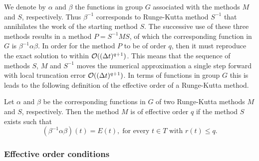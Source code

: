 We denote by $\alpha$ and $\beta$ the functions in group $G$ associated with the methods $M$ and $S$, respectively.  Thus $\beta^{-1}$ corresponds to Runge-Kutta method $S^{-1}$ that annihilates the work of the starting method $S$. The successive use of these three methods results in a method $P = S^{-1}MS$, of which the corresponding function in $G$ is $\beta^{-1}\alpha\beta$. In order for the method $P$ to be of order $q$, then it must reproduce the exact solution to within $\mathcal{O}((\Delta t)^{q+1})$. This means that the sequence of methods \( S \), \( M \) and \( S^{-1} \) moves the numerical approximation a single step forward with local truncation error \( \mathcal{O}((\Delta t)^{q+1}) \). In terms of functions in group $G$ this is leads to the following definition of the effective order of a Runge-Kutta method.
\begin{definition}\cite{Butcher1987_book}\label{def:Effective_order}
	Let $\alpha$ and $\beta$ be the corresponding functions in $G$ of two Runge-Kutta methods $M$ and $S$, respectively. Then the method $M$ is of effective order $q$ if the method $S$ exists such that
	\begin{equation}\label{eq:Effective_order_1}
		(\beta^{-1}\alpha\beta)(t) = E(t), \; \text{for every } t \in T \text{ with } r(t) \leq q.
	\end{equation}
\end{definition}

\subsubsection{Effective order conditions}\label{sec:effOrderCond}

